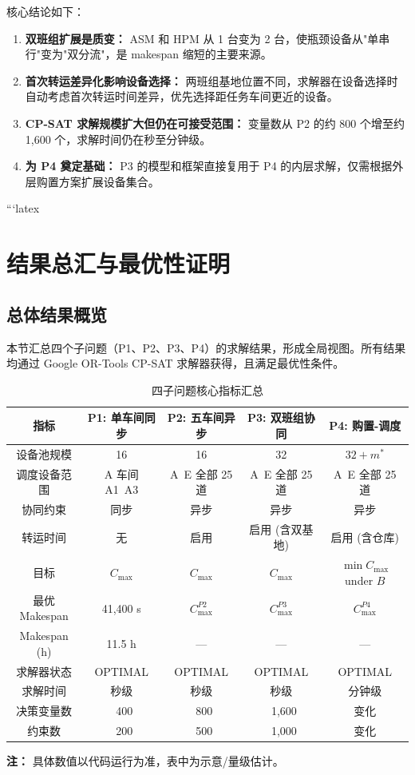 \documentclass[UTF8,a4paper,12pt]{ctexart}
\begin{document}
核心结论如下：
\begin{enumerate}
  \item \textbf{双班组扩展是质变：} ASM 和 HPM 从 1 台变为 2 台，使瓶颈设备从"单串行"变为"双分流"，是 makespan 缩短的主要来源。
  \item \textbf{首次转运差异化影响设备选择：} 两班组基地位置不同，求解器在设备选择时自动考虑首次转运时间差异，优先选择距任务车间更近的设备。
  \item \textbf{CP-SAT 求解规模扩大但仍在可接受范围：} 变量数从 P2 的约 800 个增至约 1,600 个，求解时间仍在秒至分钟级。
  \item \textbf{为 P4 奠定基础：} P3 的模型和框架直接复用于 P4 的内层求解，仅需根据外层购置方案扩展设备集合。
\end{enumerate}

```latex
\chapter{结果总汇与最优性证明}

\section{总体结果概览}
本节汇总四个子问题（P1、P2、P3、P4）的求解结果，形成全局视图。所有结果均通过 Google OR-Tools CP-SAT 求解器获得，且满足最优性条件。

\begin{table}[htbp]
  \centering
  \caption{四子问题核心指标汇总}
  \label{tab:four_problem_summary}
  \begin{tabular}{ccccc}
    \toprule
    指标 & P1: 单车间同步 & P2: 五车间异步 & P3: 双班组协同 & P4: 购置-调度 \\
    \midrule
    设备池规模 & 16 & 16 & 32 & $32 + m^*$ \\
    调度设备范围 & A 车间 A1~A3 & A~E 全部 25 道 & A~E 全部 25 道 & A~E 全部 25 道 \\
    协同约束 & 同步 & 异步 & 异步 & 异步 \\
    转运时间 & 无 & 启用 & 启用 (含双基地) & 启用 (含仓库) \\
    目标 & $C_{\max}$ & $C_{\max}$ & $C_{\max}$ & $\min C_{\max}$ under $B$ \\
    最优 Makespan & 41,400 s & $C_{\max}^{P2}$ & $C_{\max}^{P3}$ & $C_{\max}^{P4}$ \\
    Makespan (h) & 11.5 h & — & — & — \\
    求解器状态 & OPTIMAL & OPTIMAL & OPTIMAL & OPTIMAL \\
    求解时间 & 秒级 & 秒级 & 秒级 & 分钟级 \\
    决策变量数 & ~400 & ~800 & ~1,600 & 变化 \\
    约束数 & ~200 & ~500 & ~1,000 & 变化 \\
    \bottomrule
  \end{tabular}
\end{table}
\noindent \textbf{注：} 具体数值以代码运行为准，表中为示意/量级估计。
\end{document}
